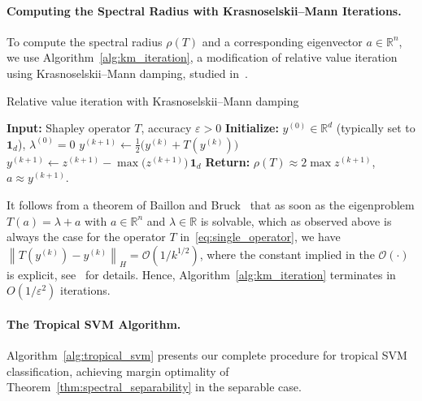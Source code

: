 \documentclass{article}
\renewcommand{\leq}{\leqslant}
\newcommand{\R}{\mathbb{R}}
\begin{document}
\paragraph{Computing the Spectral Radius with Krasnoselskii--Mann Iterations.}
\label{subsec:spectral_computation}
To compute the spectral radius $\rho(T)$ and a corresponding eigenvector $a\in \R^n$, we use
Algorithm~\ref{alg:km_iteration}, a modification of relative value
iteration using Krasnoselskii--Mann damping, studied
in~\cite{akianmfcs}.
\begin{algorithm}
\caption{Relative value iteration with Krasnoselskii--Mann damping~\cite{akianmfcs}}\label{alg:km_iteration}
\begin{algorithmic}[1]
\STATE \textbf{Input:} Shapley operator $T$, accuracy $\varepsilon > 0$
\STATE \textbf{Initialize:} $y^{(0)} \in \R^d$ (typically set to $\mathbf{1}_d$), $\lambda^{(0)} = 0$
\REPEAT
  \STATE $y^{(k+1)} \leftarrow \frac{1}{2}\bigl(y^{(k)} + T(y^{(k)})\bigr)$
  \STATE $y^{(k+1)} \leftarrow z^{(k+1)} - \max\bigl(z^{(k+1)}\bigr)\,\mathbf{1}_d$ 
  \UNTIL{$\left\|T(y^{(k)})-y^{(k)}\right\|_H\leq \varepsilon$}
  \STATE \textbf{Return:} $\rho(T) \approx 2\max z^{(k+1)}$,
  $a \approx y^{(k+1)}$.
\end{algorithmic}
\end{algorithm}
It follows from a theorem of Baillon and Bruck~\cite{baillonbruck} that
as soon as the eigenproblem $T(a)=\lambda + a$ with $a\in \R^n$ and $\lambda \in \R$ is solvable, which as observed above is always the case for the operator $T$ in~\eqref{eq:single_operator},
we have
$\left\|T(y^{(k)})-y^{(k)}\right\|_H
= \mathcal{O}(1/k^{1/2})$, where the constant implied in the $\mathcal{O}(\cdot)$ is explicit, 
see~\cite{akianmfcs} for details. 
Hence, Algorithm~\ref{alg:km_iteration} terminates in $O(1/\varepsilon^2)$ iterations.

\paragraph{The Tropical SVM Algorithm.}\label{subsec:complete_algorithm}
Algorithm~\ref{alg:tropical_svm} presents our complete procedure for tropical SVM classification, achieving margin optimality of Theorem~\ref{thm:spectral_separability} in the separable case.
\end{document}
